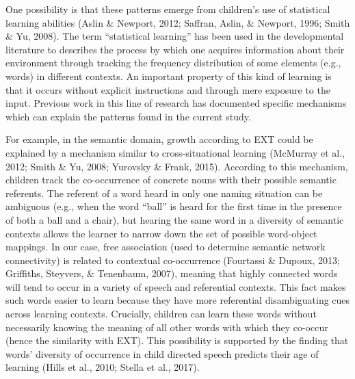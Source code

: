 \documentclass[english,floatsintext,man]{apa6}
\theoremstyle{definition}
\theoremstyle{definition}
\theoremstyle{definition}
\theoremstyle{remark}
\begin{document}
One possibility is that these patterns emerge from children's use of
statistical learning abilities (Aslin \& Newport, 2012; Saffran, Aslin,
\& Newport, 1996; Smith \& Yu, 2008). The term \enquote{statistical
learning} has been used in the developmental literature to describes the
process by which one acquires information about their environment
through tracking the frequency distribution of some elements (e.g.,
words) in different contexts. An important property of this kind of
learning is that it occurs without explicit instructions and through
mere exposure to the input. Previous work in this line of research has
documented specific mechanisms which can explain the patterns found in
the current study.

For example, in the semantic domain, growth according to EXT could be
explained by a mechanism similar to cross-situational learning (McMurray
et al., 2012; Smith \& Yu, 2008; Yurovsky \& Frank, 2015). According to
this mechanism, children track the co-occurrence of concrete nouns with
their possible semantic referents. The referent of a word heard in only
one naming situation can be ambiguous (e.g., when the word
\enquote{ball} is heard for the first time in the presence of both a
ball and a chair), but hearing the same word in a diversity of semantic
contexts allows the learner to narrow down the set of possible
word-object mappings. In our case, free association (used to determine
semantic network connectivity) is related to contextual co-occurrence
(Fourtassi \& Dupoux, 2013; Griffiths, Steyvers, \& Tenenbaum, 2007),
meaning that highly connected words will tend to occur in a variety of
speech and referential contexts. This fact makes such words easier to
learn because they have more referential disambiguating cues across
learning contexts. Crucially, children can learn these words without
necessarily knowing the meaning of all other words with which they
co-occur (hence the similarity with EXT). This possibility is supported
by the finding that words' diversity of occurrence in child directed
speech predicts their age of learning (Hills et al., 2010; Stella et
al., 2017).
\end{document}
